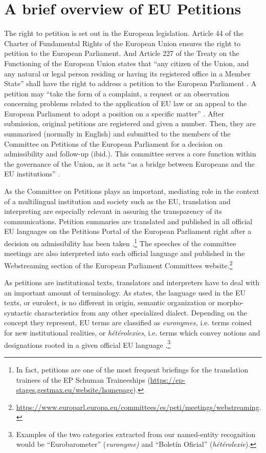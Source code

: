 \documentclass[output=paper]{langscibook}
\begin{document}
\section{A brief overview of EU Petitions}\label{sec:corpas:2}

The right to petition is set out in the European legislation. Article 44 of the Charter of Fundamental Rights of the European Union ensures the right to petition to the European Parliament. And Article 227 of the Treaty on the Functioning of the European Union states that “any citizen of the Union, and any natural or legal person residing or having its registered office in a Member State” shall have the right to address a petition to the European Parliament \citep{EU2012}. A petition  may “take the form of a complaint, a request or an observation concerning problems related to the application of EU law or an appeal to the European Parliament to adopt a position on a specific matter” \citep{EP2020FAQ}.  After submission, original petitions are registered and given a number. Then, they are summarised (normally in English) and submitted to the members of the Committee on Petitions of the European Parliament for a decision on admissibility and follow-up (ibid.). This committee serves a core function within the governance of the Union, as it acts “as a bridge between Europeans and the EU institutions” \citep{EP2020PETI}.

As the Committee on Petitions plays an important, mediating role in the context of a multilingual institution and society such as the EU, translation and interpreting are especially relevant in assuring the transparency of its communications.  Petition summaries are translated and published in all official EU languages on the Petitions Portal of the European Parliament right after a decision on admissibility has been taken \citep{EP2020FAQ}.\footnote{In fact, petitions are one of the most frequent briefings for the translation trainees of the EP Schuman Traineeships (\url{https://ep-stages.gestmax.eu/website/homepage}).} The speeches of the committee meetings are also interpreted into each official language and published in the Webstreaming section of the European Parliament Committees website.\footnote{\url{https://www.europarl.europa.eu/committees/es/peti/meetings/webstreaming}.}  

As petitions are institutional texts, translators and interpreters have to deal with an important amount of terminology. As \citet[637--638]{Goffin1994} states, the language used in the EU texts, or eurolect, is no different in origin, semantic organization or morpho-syntactic characteristics from any other specialized dialect. Depending on the concept they represent,  EU terms are classified as \textit{euronymes,} i.e. terms coined for new institutional realities, or \textit{hétérolexies}, i.e. terms which convey notions and designations rooted in a given official EU language \citep[641]{Goffin1994}.\footnote{Examples of the two categories extracted from our named-entity recognition would be “Eurobarometer” (\textit{euronyme)} and “Boletín Oficial” (\textit{hétérolexie}).}
\end{document}
